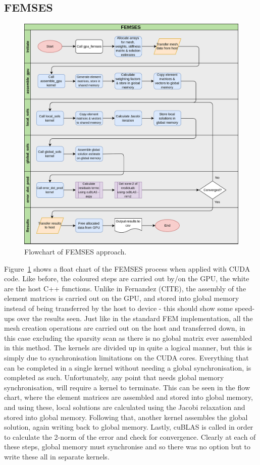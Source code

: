 \subsection{FEMSES}\label{femses}

\begin{figure}
	\centering
	\includegraphics[width=0.9\linewidth]{Figures/femses_flow}
	\caption{Flowchart of FEMSES approach.}
	\label{fig:femsesflow}
\end{figure}

Figure~\ref{fig:femsesflow} shows a float chart of the FEMSES process when applied with CUDA code. Like before, the coloured steps are carried out by/on the GPU, the white are the host C++ functions. Unlike in Fernandez (CITE), the assembly of the element matrices is carried out on the GPU, and stored into global memory instead of being transferred by the host to device - this should show some speed-ups over the results seen. Just like in the standard FEM implementation, all the mesh creation operations are carried out on the host and transferred down, in this case excluding the sparsity scan as there is no global matrix ever assembled in this method. The kernels are divided up in quite a logical manner, but this is simply due to synchronisation limitations on the CUDA cores. Everything that can be completed in a single kernel without needing a global synchronisation, is completed as such. Unfortunately, any point that needs global memory synchronisation, will require a kernel to terminate. This can be seen in the flow chart, where the element matrices are assembled and stored into global memory, and using these, local solutions are calculated using the Jacobi relaxation and stored into global memory. Following that, another kernel assembles the global solution, again writing back to global memory. Lastly, cuBLAS is called in order to calculate the 2-norm of the error and check for convergence. Clearly at each of these steps, global memory must synchronise and so there was no option but to write these all in separate kernels.

